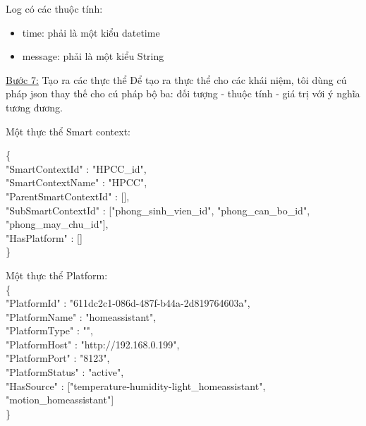 \hspace{0mm}Log có các thuộc tính:
\begin{itemize}
	\item time: phải là một kiểu datetime
	\item message: phải là một kiểu String
\end{itemize}


\underline{Bước 7:} Tạo ra các thực thể
Để tạo ra thực thể cho các khái niệm, tôi dùng cú pháp json thay thế cho cú pháp bộ ba: đối tượng - thuộc tính - giá trị với ý nghĩa tương đương.

\hspace{0mm}Một thực thể Smart context: \\
\clearpage

\{\\
\blank{1cm}"SmartContextId" : "HPCC\_id", \\
\blank{1cm}"SmartContextName" : "HPCC",	\\
\blank{1cm}"ParentSmartContextId" : [],	\\
\blank{1cm}"SubSmartContextId" : ["phong\_sinh\_vien\_id", "phong\_can\_bo\_id", "phong\_may\_chu\_id"], \\
\blank{1cm}"HasPlatform" : []\\
\}



\hspace{0mm}Một thực thể Platform: \\

\{\\
\blank{1cm}"PlatformId" : "611dc2c1-086d-487f-b44a-2d819764603a", \\
\blank{1cm}"PlatformName" : "homeassistant",	\\
\blank{1cm}"PlatformType" : "",	\\
\blank{1cm}"PlatformHost" : "http://192.168.0.199",\\
\blank{1cm}"PlatformPort" : "8123",\\
\blank{1cm}"PlatformStatus" : "active",\\
\blank{1cm}"HasSource" : ["temperature-humidity-light\_homeassistant", "motion\_homeassistant"]\\
\}

